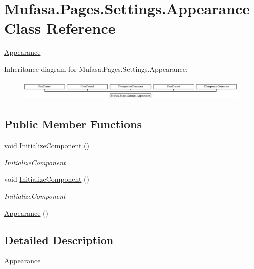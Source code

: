 \hypertarget{class_mufasa_1_1_pages_1_1_settings_1_1_appearance}{\section{Mufasa.\+Pages.\+Settings.\+Appearance Class Reference}
\label{class_mufasa_1_1_pages_1_1_settings_1_1_appearance}
}


\hyperlink{class_mufasa_1_1_pages_1_1_settings_1_1_appearance}{Appearance}  


Inheritance diagram for Mufasa.\+Pages.\+Settings.\+Appearance\+:\begin{figure}[H]
\begin{center}
\leavevmode
\includegraphics[height=1.004484cm]{class_mufasa_1_1_pages_1_1_settings_1_1_appearance}
\end{center}
\end{figure}
\subsection*{Public Member Functions}
\begin{DoxyCompactItemize}
\item 
void \hyperlink{class_mufasa_1_1_pages_1_1_settings_1_1_appearance_a6969bf455383653f027887b51642de3a}{Initialize\+Component} ()
\begin{DoxyCompactList}\small\item\em Initialize\+Component \end{DoxyCompactList}\item 
void \hyperlink{class_mufasa_1_1_pages_1_1_settings_1_1_appearance_a6969bf455383653f027887b51642de3a}{Initialize\+Component} ()
\begin{DoxyCompactList}\small\item\em Initialize\+Component \end{DoxyCompactList}\item 
\hyperlink{class_mufasa_1_1_pages_1_1_settings_1_1_appearance_a4619420c223a1d994497f6a68d1a8bd1}{Appearance} ()
\end{DoxyCompactItemize}


\subsection{Detailed Description}
\hyperlink{class_mufasa_1_1_pages_1_1_settings_1_1_appearance}{Appearance} 

